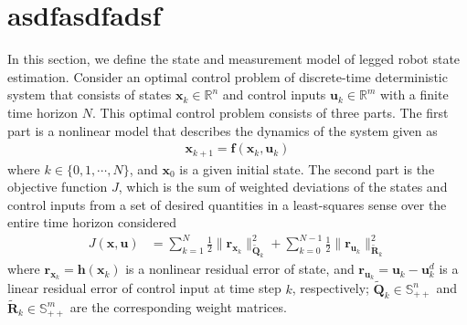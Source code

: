 \section{asdfasdfadsf} \label{asdfasdfasdfasdf}
In this section, we define the state and measurement model of legged robot state estimation.
Consider an optimal control problem of discrete-time deterministic system that consists of states $\mathbf{x}_{k} \in \mathbb{R}^{n}$ and control inputs $\mathbf{u}_{k} \in \mathbb{R}^{m}$ with a finite time horizon ${N}$. This optimal control problem consists of three parts. %
The first part is a nonlinear model that describes the dynamics of the system given as
\begin{align}
\label{eq:NMPC_dyn}
\mathbf{x}_{k+1} = \mathbf{f}(\mathbf{x}_{k},\mathbf{u}_{k})
\end{align}
where ${k} \in \{0,1,\cdots,{N}\}$, and $\mathbf{x}_{0}$ is a given initial state. The second part is the objective function ${J}$, which is the sum of weighted deviations of the states and control inputs from a set of desired quantities in a least-squares sense over the entire time horizon considered 
\begin{align}
\label{eq:NMPC_objfcn1}
J(\mathbf{x},\mathbf{u}) &= \sum_{k=1}^{N}\frac{1}{2}\|\mathbf{r}_{\mathbf{x}_{k}}\|^2_{\mathbf{\widetilde{Q}}_k} + \sum_{k=0}^{N-1}\frac{1}{2}\|\mathbf{r}_{\mathbf{u}_{k}}\|^2_{\mathbf{\widetilde{R}}_k}
\end{align}
where $\mathbf{r}_{\mathbf{x}_{k}} = \mathbf{h}(\mathbf{x}_{k})$ is a nonlinear residual error of state, and  $\mathbf{r}_{\mathbf{u}_{k}}=\mathbf{u}_{k}-\mathbf{u}^{d}_{k}$ is a linear residual error of control input at time step $k$, respectively; $\mathbf{\widetilde{Q}}_{k} \in \mathbb{S}^{n}_{++}$ and $\mathbf{\widetilde{R}}_{k} \in \mathbb{S}^{m}_{++}$ are the corresponding weight matrices. 

